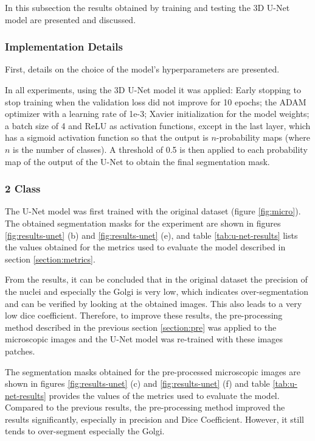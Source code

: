 In this subsection the results obtained by training and testing the 3D U-Net model are presented and discussed.

\subsubsection*{Implementation Details}

First, details on the choice of the model's hyperparameters are presented.

In all experiments, using the \ac{3D} U-Net model it was applied: Early stopping to stop training when the validation loss did not improve for 10 epochs; the ADAM optimizer with a learning rate of 1e-3; Xavier initialization for the model weights; a batch size of 4 and \ac{ReLU} as activation functions, except in the last layer, which has a sigmoid activation function so that the output is $n$-probability maps (where $n$ is the number of classes). A threshold of 0.5 is then applied to each probability map of the output of the U-Net to obtain the final segmentation mask.


\subsubsection*{2 Class}

The U-Net model was first trained with the original dataset (figure \ref{fig:micro}). The obtained segmentation masks for the experiment are shown in figures \ref{fig:results-unet} (b) and \ref{fig:results-unet} (e), and table \ref{tab:u-net-results} lists the values obtained for the metrics used to evaluate the model described in section \ref{section:metrics}.

From the results, it can be concluded that in the original dataset the precision of the nuclei and especially the Golgi is very low, which indicates over-segmentation and can be verified by looking at the obtained images. This also leads to a very low dice coefficient. Therefore, to improve these results, the pre-processing method described in the previous section \ref{section:pre} was applied to the microscopic images and the U-Net model was re-trained with these images patches.

The segmentation masks obtained for the pre-processed microscopic images are shown in figures \ref{fig:results-unet} (c) and \ref{fig:results-unet} (f) and table \ref{tab:u-net-results} provides the values of the metrics used to evaluate the model. Compared to the previous results, the pre-processing method improved the results significantly, especially in precision and Dice Coefficient. However, it still tends to over-segment especially the Golgi.

